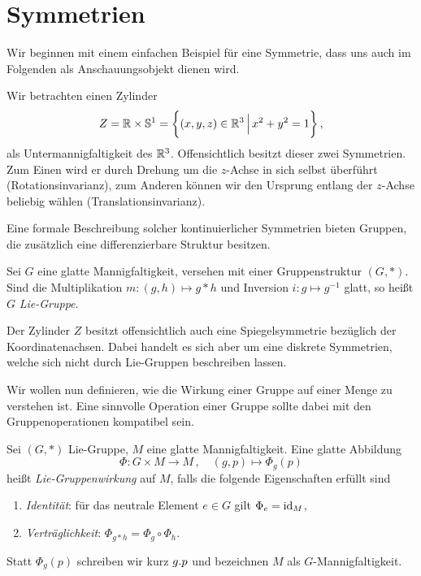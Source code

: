\section{Symmetrien}
Wir beginnen mit einem einfachen Beispiel für eine Symmetrie, dass uns auch im
Folgenden als Anschauungsobjekt dienen wird.
\begin{beispiel}
Wir betrachten einen Zylinder
\begin{equation}
Z=\Reals\times\Sphere^1=\left\{(x,y,z)\in\Reals^3\,\Big|\,x^2+y^2=1\right\}\,,
\end{equation}
als Untermannigfaltigkeit des $\mathbb{R}^3$.
Offensichtlich besitzt dieser zwei Symmetrien. Zum Einen wird er durch
Drehung um die $z$-Achse in sich selbst überführt (Rotationsinvarianz), zum
Anderen können wir den Ursprung entlang der $z$-Achse beliebig wählen
(Translationsinvarianz).
\end{beispiel}
Eine formale Beschreibung solcher kontinuierlicher Symmetrien bieten 
Gruppen, die zusätzlich eine differenzierbare Struktur besitzen.
\begin{definition}
Sei $G$ eine glatte Mannigfaltigkeit, versehen mit einer Gruppenstruktur
$(G,*)$.
Sind die Multiplikation $m:(g,h)\mapsto g* h$ und Inversion $i:g\mapsto g^{-1}$
glatt, so heißt $G$ \emph{Lie-Gruppe}.
\end{definition}
\begin{bemerkung}
Der Zylinder $Z$ besitzt offensichtlich auch eine Spiegelsymmetrie bezüglich der
Koordinatenachsen. Dabei
handelt es sich aber um eine diskrete Symmetrien, welche sich nicht durch Lie-Gruppen beschreiben lassen.
\end{bemerkung}
Wir wollen nun definieren, wie die Wirkung einer Gruppe auf einer
Menge zu verstehen ist. Eine sinnvolle Operation einer Gruppe sollte dabei mit
den Gruppenoperationen kompatibel sein.
\begin{definition}[Gruppenwirkung]
Sei $(G,*)$ Lie-Gruppe, $M$ eine glatte Mannigfaltigkeit. Eine glatte
Abbildung
\begin{equation}
\Phi:G\times M\to M\,,\quad (g,p)\mapsto\Phi_g(p)
\end{equation}
heißt \emph{Lie-Gruppenwirkung} auf $M$, falls die folgende
Eigenschaften erfüllt sind
\begin{enumerate}
  \item \emph{Identität}: für das neutrale Element $e\in G$ gilt
  $\displaystyle\Phi_e=\operatorname{id}_M$,
  \item \emph{Verträglichkeit}: $\displaystyle\Phi_{g*h}=\Phi_g\circ\Phi_h$.
\end{enumerate}
Statt $\Phi_g(p)$ schreiben wir kurz $g. p$ und bezeichnen $M$ als
$G$-Mannigfaltigkeit.
\end{definition}
